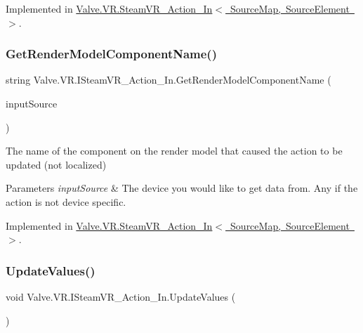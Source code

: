 Implemented in \mbox{\hyperlink{class_valve_1_1_v_r_1_1_steam_v_r___action___in_a6ae3b2c4b90917042b1fda3fe54b2d36}{Valve.\+V\+R.\+Steam\+V\+R\+\_\+\+Action\+\_\+\+In$<$ Source\+Map, Source\+Element $>$}}.

\mbox{\label{interface_valve_1_1_v_r_1_1_i_steam_v_r___action___in_a944e45d5e2e494a1bfd8d71989fe6926}} 
\subsubsection{\texorpdfstring{GetRenderModelComponentName()}{GetRenderModelComponentName()}}
{\footnotesize\ttfamily string Valve.\+V\+R.\+I\+Steam\+V\+R\+\_\+\+Action\+\_\+\+In.\+Get\+Render\+Model\+Component\+Name (\begin{DoxyParamCaption}\item[{\mbox{\hyperlink{namespace_valve_1_1_v_r_a82e5bf501cc3aa155444ee3f0662853f}{Steam\+V\+R\+\_\+\+Input\+\_\+\+Sources}}}]{input\+Source }\end{DoxyParamCaption})}



The name of the component on the render model that caused the action to be updated (not localized) 


\begin{DoxyParams}{Parameters}
{\em input\+Source} & The device you would like to get data from. Any if the action is not device specific.\\
\hline
\end{DoxyParams}


Implemented in \mbox{\hyperlink{class_valve_1_1_v_r_1_1_steam_v_r___action___in_ad435fe38eac2d62d6ce217644a6586af}{Valve.\+V\+R.\+Steam\+V\+R\+\_\+\+Action\+\_\+\+In$<$ Source\+Map, Source\+Element $>$}}.

\mbox{\label{interface_valve_1_1_v_r_1_1_i_steam_v_r___action___in_a89831097965f96913740960fa6549c27}} 
\subsubsection{\texorpdfstring{UpdateValues()}{UpdateValues()}}
{\footnotesize\ttfamily void Valve.\+V\+R.\+I\+Steam\+V\+R\+\_\+\+Action\+\_\+\+In.\+Update\+Values (\begin{DoxyParamCaption}{ }\end{DoxyParamCaption})}



